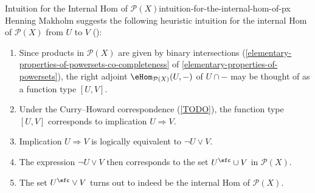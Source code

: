 \begin{remark}{Intuition for the Internal Hom of $\mathcal{P}(X)$}{intuition-for-the-internal-hom-of-px}%
    Henning Makholm suggests the following heuristic intuition for the internal Hom of $\mathcal{P}(X)$ from $U$ to $V$ (\cite{MSE267365}):
    \begin{enumerate}
        \item\label{intuition-for-the-internal-hom-of-px-1}Since products in $\mathcal{P}(X)$ are given by binary intersections (\cref{elementary-properties-of-powersets-co-completeness} of \cref{elementary-properties-of-powersets}), the right adjoint $\eHom_{\mathcal{P}(X)}(U,-)$ of $U\cap-$ may be thought of as a function type $[U,V]$.
        \item\label{intuition-for-the-internal-hom-of-px-2}Under the Curry--Howard correspondence (\cref{TODO}), the function type $[U,V]$ corresponds to implication $U\Longrightarrow V$.
        \item\label{intuition-for-the-internal-hom-of-px-3}Implication $U\Rightarrow V$ is logically equivalent to $\neg U\vee V$.
        \item\label{intuition-for-the-internal-hom-of-px-4}The expression $\neg U\vee V$ then corresponds to the set $U^{\sfc}\cup V$ in $\mathcal{P}(X)$.
        \item\label{intuition-for-the-internal-hom-of-px-5}The set $U^{\sfc}\vee V$ turns out to indeed be the internal Hom of $\mathcal{P}(X)$.
    \end{enumerate}
\end{remark}
